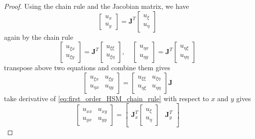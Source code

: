 \documentclass[a4]{overview}
\begin{document}
\begin{proof}
Using the chain rule and the Jacobian matrix, we have
\begin{equation} \label{eq:first_order_HSM_chain_rule}
	\begin{bmatrix} u_x\\ u_y \end{bmatrix}
	=
	\boldsymbol{J}^T
	\begin{bmatrix} u_{\xi}\\ u_{\eta} \end{bmatrix}
\end{equation}
again by the chain rule
\[
	\begin{bmatrix} u_{\xi x} \\ u_{\xi y} \end{bmatrix}
	= 
	\boldsymbol{J}^T \begin{bmatrix} u_{\xi\xi}\\ u_{\xi\eta} \end{bmatrix}
	, \quad
	\begin{bmatrix} u_{\eta x} \\ u_{\eta y} \end{bmatrix}
	= 
	\boldsymbol{J}^T \begin{bmatrix} u_{\eta\xi}\\ u_{\eta\eta} \end{bmatrix}
\] 
	transpose above two equations and combine them gives
	\begin{equation} \label{eq:second_order_HSM_chain_rule}
		\begin{bmatrix} u_{\xi x} & u_{\xi y} \\ u_{\eta x} & u_{\eta y} \end{bmatrix}
		=
		\begin{bmatrix}
			u_{\xi\xi} & u_{\xi\eta}\\
			u_{\eta\xi} & u_{\eta\eta}
		\end{bmatrix}
		\boldsymbol{J}
	\end{equation}
	take derivative of \eqref{eq:first_order_HSM_chain_rule} with respect to $x$ and $y$ gives
	\[
		\begin{bmatrix} u_{xx} & u_{xy}\\ u_{yx} & u_{yy} \end{bmatrix}
		=
		\begin{bmatrix}
		\boldsymbol{J}^T_x
		\begin{bmatrix} u_{\xi}\\ u_{\eta} \end{bmatrix}
		&
		\boldsymbol{J}^T_y

\end{bmatrix}\]
\end{proof}
\end{document}
